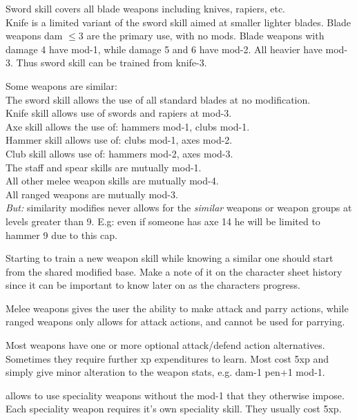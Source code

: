 Sword skill covers all blade weapons including knives, rapiers, etc. \\
Knife is a limited variant of the sword skill aimed at smaller lighter blades. Blade weapons dam $\leq$3 are the primary use, with no mods. Blade weapons with damage 4 have mod-1, while damage 5 and 6 have mod-2. All heavier have mod-3. Thus sword skill can be trained from knife-3.

Some weapons are similar:\\
The sword skill allows the use of all standard blades at no modification.\\
Knife skill allows use of swords and rapiers at mod-3.\\
Axe skill allows the use of: hammers mod-1, clubs mod-1.\\
Hammer skill allows use of: clubs mod-1, axes mod-2.\\
Club skill allows use of: hammers mod-2, axes mod-3.\\
The staff and spear skills are mutually mod-1.\\
All other melee weapon skills are mutually mod-4.\\
All ranged weapons are mutually mod-3.\\
\emph{But:} similarity modifies never allows for the \emph{similar} weapons or weapon groups at levels greater than 9. E.g: even if someone has axe 14 he will be limited to hammer 9 due to this cap.


Starting to train a new weapon skill while knowing a similar one should start from the shared modified base. Make a note of it on the character sheet history since it can be important to know later on as the characters progress.

Melee weapons gives the user the ability to make attack and parry actions, while ranged weapons only allows for attack actions, and cannot be used for parrying.

Most weapons have one or more optional attack/defend action alternatives. Sometimes they require further xp expenditures to learn. Most cost 5xp and simply give minor alteration to the weapon stats, e.g. dam-1 pen+1 mod-1.


 allows to use speciality weapons without the mod-1 that they otherwise impose. Each speciality weapon requires it's own speciality skill. They usually cost 5xp.


